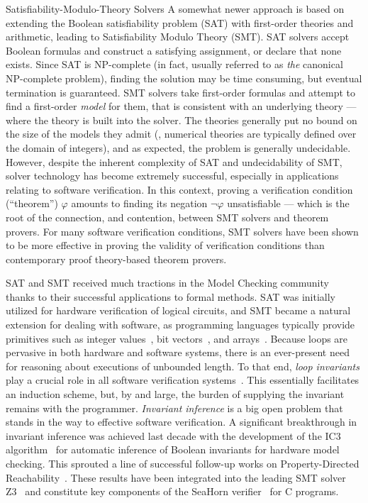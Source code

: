 \begin{paragraph}{Satisfiability-Modulo-Theory Solvers}
A somewhat newer approach is based on extending the
Boolean satisfiability problem (SAT) with first-order theories and arithmetic, leading to
Satisfiability Modulo Theory (SMT).
SAT solvers accept Boolean formulas and construct a satisfying assignment, or
declare that none exists.
Since SAT is NP-complete (in fact, usually referred to as \emph{the} canonical
NP-complete problem), finding the solution may be time consuming, but eventual
termination is guaranteed.
SMT solvers take first-order formulas and attempt to find a first-order
\emph{model} for them, that is consistent with an underlying theory --- where the
theory is built into the solver.
The theories generally put no bound on the size of the models they admit
(\eg, numerical theories are typically defined over the domain of integers),
and as expected, the problem is generally undecidable.
However, despite the inherent complexity of SAT and undecidability of SMT,
solver technology has become extremely successful, especially in applications
relating to software verification.
In this context, proving a verification condition (``theorem'') $\varphi$
amounts to finding its negation $\lnot\varphi$ unsatisfiable --- which is the root
of the connection, and contention, between SMT solvers and theorem provers.
For many software verification conditions, SMT solvers have been shown to be
more effective in proving the validity of verification conditions than
contemporary proof theory-based theorem provers.

SAT and SMT received much tractions in the Model Checking community~\cite{Book2001:Clarke,SSS2014:Grumberg} thanks to their successful applications to formal methods.
SAT was initially utilized for hardware verification of logical circuits, and SMT became a natural extension for dealing with software, as programming languages typically provide primitives such as integer values~\cite{CAV2006:Dutertre}, bit vectors~\cite{TACAS2007:Bryant}, and arrays~\cite{CAV2007:Ganesh}.
Because loops are pervasive in both hardware and software systems, there is an ever-present need for reasoning about executions of unbounded length.
To that end, \emph{loop invariants} play a crucial role in all software verification systems~\cite{dafny,fstar,leon}.
This essentially facilitates an induction scheme, but, by and large, the burden of supplying the invariant remains with the programmer.
\emph{Invariant inference} is a big open problem that stands in the way to effective software verification.
A significant breakthrough in invariant inference was achieved last decade with the development of the IC3 algorithm~\cite{bradley11} for automatic inference of Boolean invariants for hardware model checking.
This sprouted a line of successful follow-up works on Property-Directed Reachability~\cite{gurfinkel,shoham,vizel}.
These results have been integrated into the leading SMT solver Z3~\cite{Z3SMT,CAV2013:Komuravelli,CAV2014:Komuravelli} and constitute key components of the SeaHorn verifier~\cite{TACAS2015:Gurfinkel} for C programs.
\end{paragraph}


